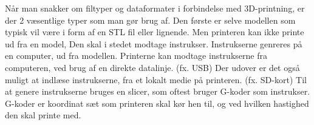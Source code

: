 Når man snakker om filtyper og dataformater i forbindelse med 3D-printning, er der 2 væsentlige typer som man gør brug af. Den første er selve modellen som typisk vil være i form af en STL fil eller lignende. Men printeren kan ikke printe ud fra en model, Den skal i stedet modtage instrukser. Instrukserne genreres på en computer, ud fra modellen. Printerne kan modtage instrukserne fra computeren, ved brug af en direkte datalinje. (fx. USB) Der udover er det også muligt at indlæse instrukserne, fra et lokalt medie på printeren. (fx. SD-kort)
Til at genere instrukserne bruges en slicer, som oftest bruger G-koder som instrukser. G-koder er koordinat sæt som printeren skal kør hen til, og ved hvilken hastighed den skal printe med.